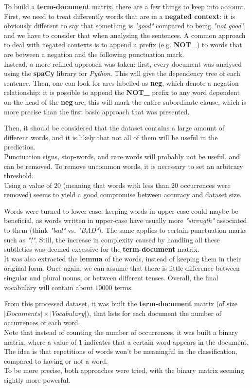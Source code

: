 \documentclass[
12pt,
a4paper,
oneside,
headinclude,
footinclude]{article}
\theoremstyle{definition} %
\begin{document}
To build a \textbf{term-document} matrix, there are a few things to keep into account.\\
First, we need to treat differently words that are in a \textbf{negated context}: it is obviously different to say that something is \textit{"good"} compared to being \textit{"not good"}, and we have to consider that when analysing the sentences. A common approach to deal with negated contexts is to append a prefix (e.g. \textbf{NOT\_}) to words that are between a negation and the following punctuation mark.\\
Instead, a more refined approach was taken: first, every document was analysed using the \textbf{spaCy} library for \textit{Python}. This will give the dependency tree of each sentence. Then, one can look for arcs labelled as \textbf{neg}, which denote a negation relationship: it is possible to append the \textbf{NOT\_} prefix to any word dependent on the head of the \textbf{neg} arc; this will mark the entire subordinate clause, which is more precise than the first basic approach that was presented. 

Then, it should be considered that the dataset contains a large amount of different words, and it is likely that not all of them will be useful in the prediction.\\
Punctuation signs, stop-words, and rare words will probably not be useful, and can be removed. To remove uncommon words, it is necessary to set an arbitrary threshold.\\
 Using a value of $20$ (meaning that words with less than $20$ occurrences were removed) seems to yield a good compromise between accuracy and dataset size.

Words were turned to lower-case: keeping words in upper-case could maybe be beneficial, as words written in upper-case have usually more \textit{"strength"} associated to them (think \textit{"bad"} vs. \textit{"BAD"}). The same applies to certain punctuation marks such as \textit{"!"}. Still, the increase in complexity caused by handling all these subtleties was deemed excessive for the \textbf{term-document} matrix.\\
It was also extracted the \textbf{lemma} of the words, instead of keeping them in their original form. Once again, we can assume that there is little difference between singular and plural nouns, or between different tenses.
Overall, the final vocabulary will contain about $10000$ terms.

From this processed dataset, it was built the \textbf{term-document} matrix (of size $|Documents| \times |Vocabulary|$), that lists for each document the number of occurrences of each word.\\
Note that instead of counting the number of occurrences, it was built a binary matrix, where a value of $1$ indicates that a certain word appears in the document. The idea is that repetitions of words won't be meaningful in the classification, compared to having or not a word. \\
To be more precise, both approaches were tried, with the binary matrix seeming sightly more powerful.\\
\end{document}
